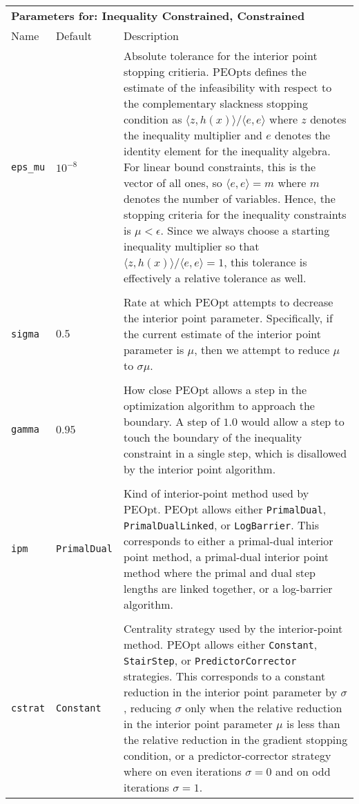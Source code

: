 \documentclass{report}
\begin{document}
\begin{longtable}{llp{}}
\\
\multicolumn{3}{p{\textwidth}}{\bf Parameters for: Inequality Constrained, Constrained}\\
Name & Default & Description\\
\texttt{eps\_mu} & $10^{-8}$
    & Absolute tolerance for the interior point stopping critieria.  PEOpts defines the estimate of the infeasibility with respect to the complementary slackness stopping condition as $\langle z,h(x) \rangle/\langle e,e\rangle$ where $z$ denotes the inequality multiplier and $e$ denotes the identity element for the inequality algebra.  For linear bound constraints, this is the vector of all ones, so $\langle e,e\rangle=m$ where $m$ denotes the number of variables.  Hence, the stopping criteria for the inequality constraints is $\mu < \epsilon$.  Since we always choose a starting inequality multiplier so that $\langle z,h(x) \rangle/\langle e,e\rangle=1$, this tolerance is effectively a relative tolerance as well.\\
\\
\texttt{sigma} & $0.5$
    & Rate at which PEOpt attempts to decrease the interior point parameter.  Specifically, if the current estimate of the interior point parameter is $\mu$, then we attempt to reduce $\mu$ to $\sigma \mu$.\\
\\
\texttt{gamma} & $0.95$
    & How close PEOpt allows a step in the optimization algorithm to approach the boundary.  A step of $1.0$ would allow a step to touch the boundary of the inequality constraint in a single step, which is disallowed by the interior point algorithm.\\
\\
\texttt{ipm} & \texttt{PrimalDual}
    & Kind of interior-point method used by PEOpt.  PEOpt allows either \texttt{PrimalDual}, \texttt{PrimalDualLinked}, or \texttt{LogBarrier}.  This corresponds to either a primal-dual interior point method, a primal-dual interior point method where the primal and dual step lengths are linked together, or a log-barrier algorithm.\\
\\
\texttt{cstrat} & \texttt{Constant}
    & Centrality strategy used by the interior-point method.  PEOpt allows either \texttt{Constant}, \texttt{StairStep}, or \texttt{PredictorCorrector} strategies.  This corresponds to a constant reduction in the interior point parameter by $\sigma$, reducing $\sigma$ only when the relative reduction in the interior point parameter $\mu$ is less than the relative reduction in the gradient stopping condition, or a predictor-corrector strategy where on even iterations $\sigma=0$ and on odd iterations $\sigma=1$.\\

\end{longtable}
\end{document}
